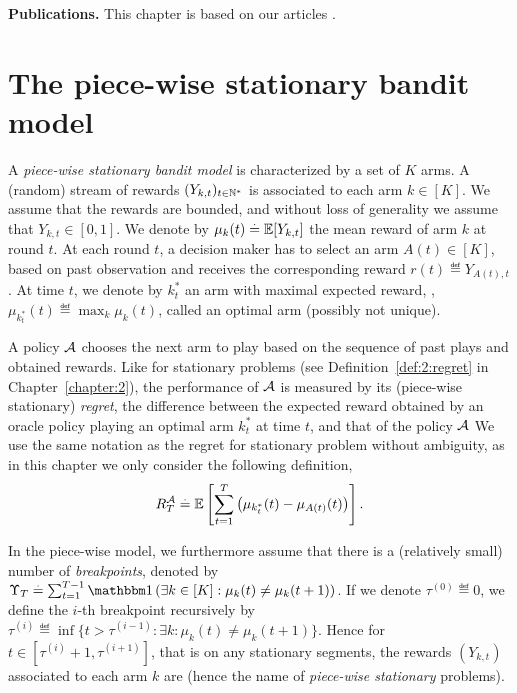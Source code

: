 \textbf{Publications.}
%
This chapter is based on our articles \cite{Besson2019GLRT,Besson2019Gretsi}.


\section{The piece-wise stationary bandit model}
\label{sec:6:BanditSetting}

A \emph{piece-wise stationary bandit model} is characterized by a set of $K$ arms.
A (random) stream of rewards $(Y_{k,t})_{t\in\mathbb{N}^*}$ is associated to each arm $k \in [K]$. We assume that the rewards are bounded, and without loss of generality we assume that $Y_{k,t} \in [0,1]$.
We denote by $\mu_k(t) \overset{.}{=}  \mathbb{E}[Y_{k,t}]$ the mean reward of arm $k$ at round $t$. At each round $t$, a decision maker has to select an arm $A(t)\in[K]$, based on past observation and receives the corresponding reward $r(t) \eqdef Y_{A(t),t}$.
At time $t$, we denote by $k_t^*$ an arm with maximal expected reward, \ie, $\mu_{k_t^*}(t) \eqdef \max_k \mu_k(t)$, called an optimal arm (possibly not unique).

A policy $\mathcal{A}$ chooses the next arm to play based on the sequence of past plays and obtained rewards.
Like for stationary problems (see Definition~\ref{def:2:regret} in Chapter~\ref{chapter:2}), the performance of $\mathcal{A}$ is measured by its (piece-wise stationary) \emph{regret}, the difference between the expected reward obtained by an oracle policy playing an optimal arm $k_t^*$ at time $t$, and that of the policy $\mathcal{A}$
We use the same notation as the regret for stationary problem without ambiguity, as in this chapter we only consider the following definition,
%
\begin{equation}\label{def:6:nti}
    R_T^{\mathcal{A}} \overset{.}{=} \mathbb{E}\left[\sum_{t=1}^T \left(\mu_{k_t^*}(t) - \mu_{A(t)}(t)\right)\right].
\end{equation}


In the piece-wise \iid{} model, we furthermore assume that there is a (relatively small) number of \emph{breakpoints}, denoted by $\Upsilon_T \eqdef \sum_{t=1}^{T-1} \indic\left(\exists k\in[K]: \mu_k(t) \neq \mu_k(t+1)\right)$.
If we denote $\tau^{(0)} \eqdef 0$, we define the $i$-th breakpoint recursively by
$\tau^{(i)} \eqdef \inf\{t > \tau^{(i-1)} : \exists k : \mu_k(t) \neq \mu_k(t+1)\}$.
%
Hence for $t\in[\tau^{(i)} + 1,\tau^{(i+1)}]$, that is on any stationary segments, the rewards $(Y_{k,t})$ associated to each arm $k$ are \iid{} (hence the name of \emph{piece-wise stationary} problems).

